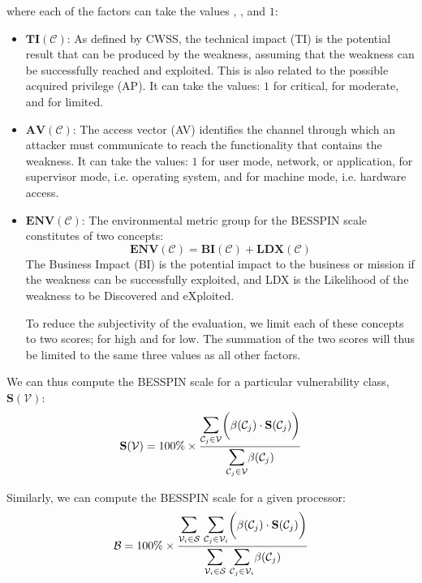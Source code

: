\documentclass{article}
\begin{document}
where each of the factors can take the values , , and $1$:
\begin{itemize}
    \item $\mathbf{TI}(\mathcal{C})$: As defined by CWSS, the technical impact (TI) is the potential result that can be produced by the weakness, assuming that the weakness can be successfully reached and exploited. This is also related to the possible acquired privilege (AP). It can take the values: $1$ for critical,  for moderate, and  for limited.
    \item $\mathbf{AV}(\mathcal{C})$: The access vector (AV) identifies the channel through which an attacker must communicate to reach the functionality that contains the weakness. It can take the values: $1$ for user mode, network, or application,  for supervisor mode, i.e. operating system, and  for machine mode, i.e. hardware access.
    \item $\mathbf{ENV}(\mathcal{C})$: The environmental metric group for the BESSPIN scale constitutes of two concepts:
    \begin{equation}
        \mathbf{ENV}(\mathcal{C}) = \mathbf{BI}(\mathcal{C}) + \mathbf{LDX}(\mathcal{C})
    \end{equation}
    The Business Impact (BI) is the potential impact to the business or mission if the weakness can be successfully exploited, and LDX is the Likelihood of the weakness to be Discovered and eXploited. 
    
    To reduce the subjectivity of the evaluation, we limit each of these concepts to two scores;  for high and  for low. The summation of the two scores will thus be limited to the same three values as all other factors.
\end{itemize} 

We can thus compute the BESSPIN scale for a particular vulnerability class, $\mathbf{S}(\mathcal{V})$:
\begin{equation}
  \mathbf{S}(\mathcal{V}) =
    100\% \times \frac{
      \mathlarger{\mathlarger{\sum}}_{\mathcal{C}_{j} \in \mathcal{V}} \bigg( \beta(\mathcal{C}_{j}) \cdot \mathbf{S}(\mathcal{C}_{j}) \bigg)
    }{
      \mathlarger{\mathlarger{\sum}}_{\mathcal{C}_{j} \in \mathcal{V}} \beta(\mathcal{C}_{j})
    }
\end{equation}

Similarly, we can compute the BESSPIN scale for a given processor:
\begin{equation}
\mathcal{B} =
    100\% \times \frac{
      \mathlarger{\mathlarger{\sum}}_{\mathcal{V}_{i} \in \mathcal{S}} \ \mathlarger{\mathlarger{\sum}}_{\mathcal{C}_{j} \in \mathcal{V}_{i}} \bigg( \beta(\mathcal{C}_{j}) \cdot \mathbf{S}(\mathcal{C}_{j}) \bigg)
    }{
      \mathlarger{\mathlarger{\sum}}_{\mathcal{V}_{i} \in \mathcal{S}} \ \mathlarger{\mathlarger{\sum}}_{\mathcal{C}_{j} \in \mathcal{V}_{i}} \beta(\mathcal{C}_{j})
    } 
\end{equation}
\end{document}

